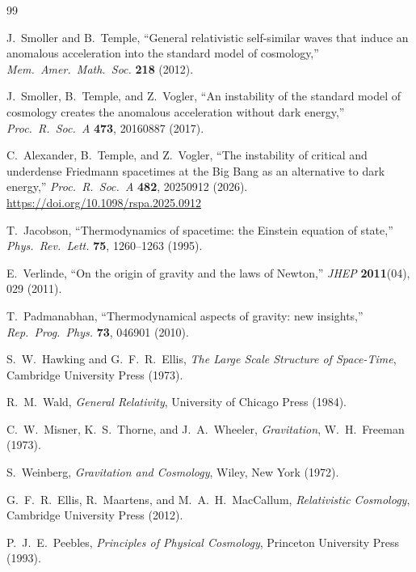 \documentclass[12pt,a4paper]{article}
\theoremstyle{plain}
\theoremstyle{definition}
\theoremstyle{remark}
\begin{document}

\begin{thebibliography}{99}

J.~Smoller and B.~Temple,
``General relativistic self-similar waves that induce an anomalous acceleration
into the standard model of cosmology,''
\textit{Mem.\ Amer.\ Math.\ Soc.} \textbf{218} (2012).

J.~Smoller, B.~Temple, and Z.~Vogler,
``An instability of the standard model of cosmology creates the anomalous
acceleration without dark energy,''
\textit{Proc.\ R.\ Soc.\ A} \textbf{473}, 20160887 (2017).

C.~Alexander, B.~Temple, and Z.~Vogler,
``The instability of critical and underdense Friedmann spacetimes at the Big Bang
as an alternative to dark energy,''
\textit{Proc.\ R.\ Soc.\ A} \textbf{482}, 20250912 (2026).
\url{https://doi.org/10.1098/rspa.2025.0912}

T.~Jacobson,
``Thermodynamics of spacetime: the Einstein equation of state,''
\textit{Phys.\ Rev.\ Lett.} \textbf{75}, 1260--1263 (1995).

E.~Verlinde,
``On the origin of gravity and the laws of Newton,''
\textit{JHEP} \textbf{2011}(04), 029 (2011).

T.~Padmanabhan,
``Thermodynamical aspects of gravity: new insights,''
\textit{Rep.\ Prog.\ Phys.} \textbf{73}, 046901 (2010).

S.~W.~Hawking and G.~F.~R.~Ellis,
\textit{The Large Scale Structure of Space-Time},
Cambridge University Press (1973).

R.~M.~Wald,
\textit{General Relativity},
University of Chicago Press (1984).

C.~W.~Misner, K.~S.~Thorne, and J.~A.~Wheeler,
\textit{Gravitation},
W.~H.~Freeman (1973).

S.~Weinberg,
\textit{Gravitation and Cosmology},
Wiley, New York (1972).

G.~F.~R.~Ellis, R.~Maartens, and M.~A.~H.~MacCallum,
\textit{Relativistic Cosmology},
Cambridge University Press (2012).

P.~J.~E.~Peebles,
\textit{Principles of Physical Cosmology},
Princeton University Press (1993).


\end{thebibliography}
\end{document}
